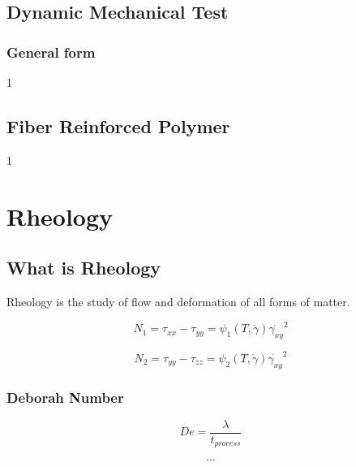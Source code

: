 \documentclass{NoteThesis/note-thesis}
\begin{document}
\subsection{Dynamic Mechanical Test}

\subsubsection*{General form}

1

\subsection{Fiber Reinforced Polymer}

1

\section{Rheology}

\subsection{What is Rheology}

Rheology is the study of flow and deformation of all forms of matter.

\[
N_1 = \tau_{xx} - \tau_{yy} = \psi_1 (T,\dot{\gamma}) \dot{\gamma_{xy}}^2
\]

\[
N_2 = \tau_{yy} - \tau_{zz} = \psi_2 (T,\dot{\gamma}) \dot{\gamma_{xy}}^2
\] 

\subsubsection*{Deborah Number}

\[
De = \frac{\lambda}{t_{process}}
\]

\[\cdots \]

\subsection{}
\end{document}
